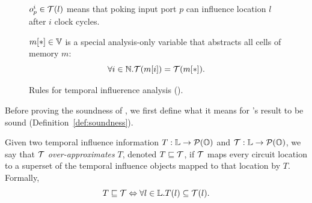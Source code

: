 \begin{figure}[tp]
    \centering
    $o_p^i \in \mathcal{T}(l)$ means that poking input port $p$ can influence location $l$ after $i$ clock cycles.
    \vspace{-1ex}


    \vspace{.5ex}

    $m[*] \in \mathbb{V}$ is a special analysis-only variable that abstracts all cells of memory $m$:
    \[
    \forall i \in \mathbb{N}. \mathcal{T}(m[i]) = \mathcal{T}(m[*]).
    \]

    \caption{Rules for temporal influerence analysis (\tia).}\label{fig:tia}

\end{figure}

Before proving the soundness of \tia, we first define what it means for \tia's result to be sound (Definition~\ref{def:soundness}).

\begin{definition}\label{def:over-approx}
    Given two temporal influence information $T: \mathbb{L} \to \mathcal{P}(\mathbb{O})$ and $\mathcal{T}: \mathbb{L} \to \mathcal{P}(\mathbb{O})$, we say that $\mathcal{T}$ \emph{over-approximates} $T$, denoted $T \sqsubseteq \mathcal{T}$, if $\mathcal{T}$ maps every circuit location to a superset of the temporal influence objects mapped to that location by $T$.
    Formally,
    \[
    T \sqsubseteq \mathcal{T} \Leftrightarrow \forall l \in \mathbb{L}. T(l) \subseteq \mathcal{T}(l).
    \]
\end{definition}

